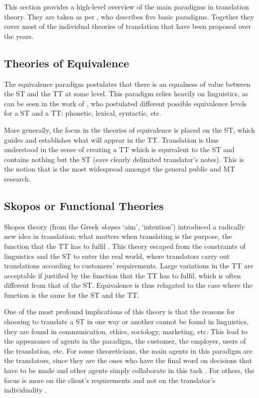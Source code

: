 \noindent This section provides a high-level overview of the main paradigms in translation theory. They are taken as per \textcite{pym2009exploring}, who describes five basic paradigms. Together they cover most of the individual theories of translation that have been proposed over the years. 

\subsection{Theories of Equivalence}

\noindent The equivalence paradigm postulates that there is an equalness of value between the \ac{ST} and the \ac{TT} at some level. This paradigm relies heavily on linguistics, as can be seen in the work of \textcite{catford1965linguistic}, who postulated different possible equivalence levels for a \ac{ST} and a \ac{TT}: phonetic, lexical, syntactic, etc.

More generally, the focus in the theories of equivalence is placed on the \ac{ST}, which guides and establishes what will appear in the \ac{TT}. Translation is thus understood in the sense of creating a \ac{TT} which is equivalent to the \ac{ST} and contains nothing but the \ac{ST} (save clearly delimited translator's notes). This is the notion that is the most widespread amongst the general public and \ac{MT} research.

\subsection{Skopos or Functional Theories}

\noindent Skopos theory (from the Greek \textit{skopos} `aim', `intention') introduced a radically new idea in translation: what matters when translating is the purpose, the function that the \ac{TT} has to fulfil \parencite{holz1984translatorisches,reiss1984grundlegung}. This theory escaped from the constraints of linguistics and the \ac{ST} to enter the real world, where translators carry out translations according to customers' requirements. Large variations in the \ac{TT} are acceptable if justified by the function that the \ac{TT} has to fulfil, which is often different from that of the \ac{ST}. Equivalence is thus relagated to the case where the function is the same for the \ac{ST} and the \ac{TT}. 

One of the most profound implications of this theory is that the reasons for choosing to translate a \ac{ST} in one way or another cannot be found in linguistics, they are found in communication, ethics, sociology, marketing, etc. This lead to the appearance of agents in the paradigm, \ie the customer, the employer, users of the translation, etc. For some theoreticians, the main agents in this paradigm are the translators, since they are the ones who have the final word on decisions that have to be made and other agents simply collaborate in this task \parencite{reiss1984grundlegung}. For others, the focus is more on the client's requirements and not on the translator's individuality \parencite{nord1997translation}.

